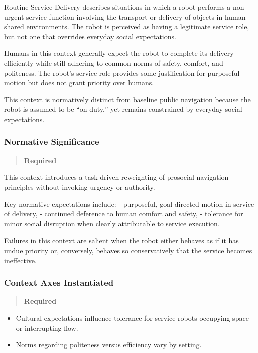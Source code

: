 \documentclass[utf8]{frontiers_suppmat} %
\providecommand{\tightlist}{%
  \setlength{\itemsep}{0pt}\setlength{\parskip}{0pt}}
\begin{document}
Routine Service Delivery describes situations in which a robot performs
a non-urgent service function involving the transport or delivery of
objects in human-shared environments. The robot is perceived as having a
legitimate service role, but not one that overrides everyday social
expectations.

Humans in this context generally expect the robot to complete its
delivery efficiently while still adhering to common norms of safety,
comfort, and politeness. The robot's service role provides some
justification for purposeful motion but does not grant priority over
humans.

This context is normatively distinct from baseline public navigation
because the robot is assumed to be ``on duty,'' yet remains constrained
by everyday social expectations.

\subsubsection{Normative Significance}\label{normative-significance}

\begin{quote}
\textbf{Required}
\end{quote}

This context introduces a task-driven reweighting of prosocial
navigation principles without invoking urgency or authority.

Key normative expectations include: - purposeful, goal-directed motion
in service of delivery, - continued deference to human comfort and
safety, - tolerance for minor social disruption when clearly
attributable to service execution.

Failures in this context are salient when the robot either behaves as if
it has undue priority or, conversely, behaves so conservatively that the
service becomes ineffective.

\subsubsection{Context Axes Instantiated}\label{context-axes-instantiated}

\begin{quote}
\textbf{Required}
\end{quote}

\label{cultural-context}

\begin{itemize}
\tightlist
\item
  Cultural expectations influence tolerance for service robots occupying
  space or interrupting flow.
\item
  Norms regarding politeness versus efficiency vary by setting.
\end{itemize}
\end{document}
